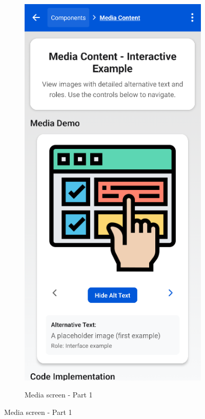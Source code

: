 \begin{figure}[ht]
\begin{subfigure}[b]{0.48\textwidth}
        \includegraphics[width=\linewidth, alt={First part of the Media screen}]{img/media1.png}
        \caption{Media screen - Part 1}

\end{subfigure}
\end{figure}
